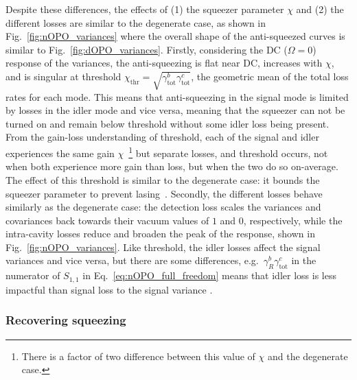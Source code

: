 Despite these differences, the effects of (1) the squeezer parameter $\chi$ and (2) the different losses are similar to the degenerate case, as shown in Fig.~\ref{fig:nOPO_variances} where the overall shape of the anti-squeezed curves is similar to Fig.~\ref{fig:dOPO_variances}. 
Firstly, considering the DC ($\Omega=0$) response of the variances, the anti-squeezing is flat near DC, increases with $\chi$, and is singular at threshold $\chi_\text{thr}=\sqrt{\gamma^b_\text{tot}\gamma^c_\text{tot}}$, the geometric mean of the total loss rates for each mode. This means that anti-squeezing in the signal mode is limited by losses in the idler mode and vice versa, meaning that the squeezer can not be turned on and remain below threshold without some idler loss being present. %
From the gain-loss understanding of threshold, each of the signal and idler experiences the same gain $\chi$~\footnote{There is a factor of two difference between this value of $\chi$ and the degenerate case.} but separate losses, and threshold occurs, not when both experience more gain than loss, but when the two do so on-average. The effect of this threshold is similar to the degenerate case: it bounds the squeezer parameter to prevent lasing~\cite{}.  
Secondly, the different losses behave similarly as the degenerate case: the detection loss scales the variances and covariances back towards their vacuum values of $1$ and $0$, respectively, while the intra-cavity losses reduce and broaden the peak of the response, shown in Fig.~\ref{fig:nOPO_variances}. Like threshold, the idler losses affect the signal variances and vice versa, but there are some differences, e.g.\ $\gamma^b_R {\gamma^c_\text{tot}}$ in the numerator of $S_{1,1}$ in Eq.~\ref{eq:nOPO_full_freedom} means that idler loss is less impactful than signal loss to the signal variance . 


\subsubsection{Recovering squeezing}


